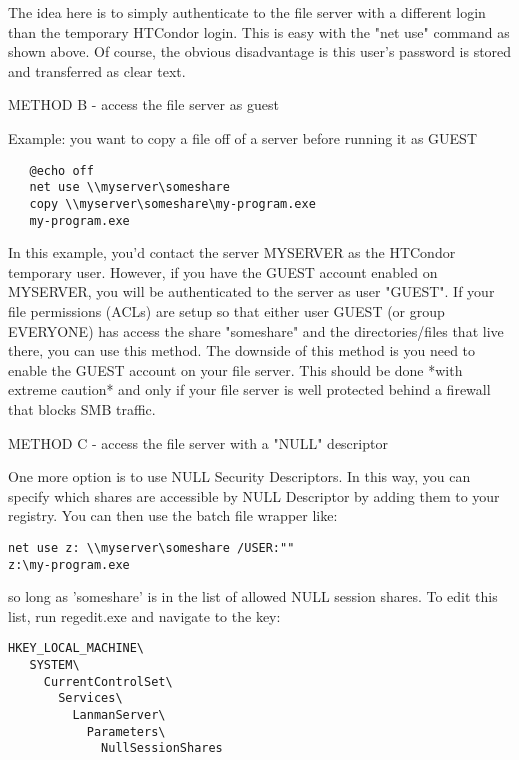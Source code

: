 The idea here is to simply authenticate to the file server with a different 
login than the temporary HTCondor login.  This is easy with the "net use" 
command as shown above.  Of course, the obvious disadvantage is this user's 
password is stored and transferred as clear text.

METHOD B - access the file server as guest

Example: you want to copy a file off of a server before running it as GUEST

\begin{verbatim}
   @echo off
   net use \\myserver\someshare
   copy \\myserver\someshare\my-program.exe
   my-program.exe
\end{verbatim}

In this example, you'd contact the server MYSERVER as the HTCondor temporary 
user.  However, if you have the GUEST account enabled on MYSERVER, you will 
be authenticated to the server as user "GUEST".  If your file permissions 
(ACLs) are setup so that either user GUEST (or group EVERYONE) has access 
the share "someshare" and the directories/files that live there, you can 
use this method.  The downside of this method is you need to enable the 
GUEST account on your file server.   \Warn This should be done *with 
extreme caution* and only if your file server is well protected behind a 
firewall that blocks SMB traffic.

METHOD C - access the file server with a "NULL" descriptor

One more option is to use NULL Security Descriptors.  In this way, you
can specify which shares are accessible by NULL Descriptor by adding
them to your registry.  You can then use the batch file wrapper like:

\begin{verbatim}
net use z: \\myserver\someshare /USER:""
z:\my-program.exe
\end{verbatim}

so long as 'someshare' is in the list of allowed NULL session shares.  To
edit this list, run regedit.exe and navigate to the key:

\begin{verbatim}
HKEY_LOCAL_MACHINE\
   SYSTEM\
     CurrentControlSet\
       Services\
         LanmanServer\
           Parameters\
             NullSessionShares
\end{verbatim}

